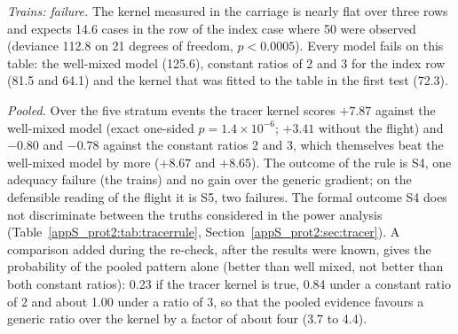 \emph{Trains: failure.} The kernel measured in the carriage is nearly flat over three rows and expects 14.6
cases in the row of the index case where 50 were observed (deviance 112.8 on 21 degrees of freedom,
$p<0.0005$). Every model fails on this table: the well-mixed model (125.6), constant ratios of 2 and 3 for the
index row (81.5 and 64.1) and the kernel that was fitted to the table in the first test (72.3).

\emph{Pooled.} Over the five stratum events the tracer kernel scores $+7.87$ against the well-mixed model
(exact one-sided $p=1.4\times10^{-6}$; $+3.41$ without the flight) and $-0.80$ and $-0.78$ against the constant
ratios 2 and 3, which themselves beat the well-mixed model by more ($+8.67$ and $+8.65$). The outcome of the
rule is S4, one adequacy failure (the trains) and no gain over the generic gradient; on the defensible reading
of the flight it is S5, two failures. The formal outcome S4 does not discriminate between the truths considered
in the power analysis (Table~\ref{appS_prot2:tab:tracerrule}, Section~\ref{appS_prot2:sec:tracer}). A
comparison added during the re-check, after the results were known, gives the probability of the pooled pattern
alone (better than well
mixed, not better than both constant ratios): 0.23 if the tracer kernel is true, 0.84 under a constant ratio of
2 and about 1.00 under a ratio of 3, so that the pooled evidence favours a generic ratio over the kernel by a
factor of about four (3.7 to 4.4).


